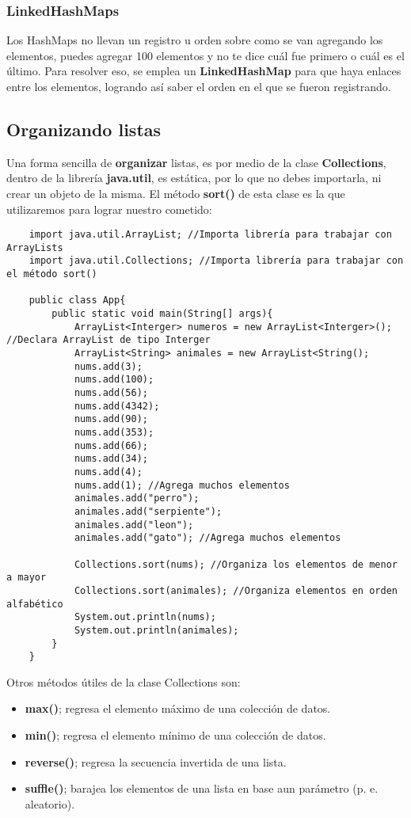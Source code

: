 \subsubsection{LinkedHashMaps}
Los HashMaps no llevan un registro u orden sobre como se van agregando los elementos, puedes agregar 100 elementos y no te dice cuál fue primero o cuál es el último. Para resolver eso, se emplea un \textbf{LinkedHashMap} para que haya enlaces entre los elementos, logrando así saber el orden en el que se fueron registrando.

\subsection{Organizando listas}
Una forma sencilla de \textbf{organizar} listas, es por medio de la clase \textbf{Collections}, dentro de la librería \textbf{java.util}, es estática, por lo que no debes importarla, ni crear un objeto de la misma. El método \textbf{sort()} de esta clase es la que utilizaremos para lograr nuestro cometido:
\begin{lstlisting}
    import java.util.ArrayList; //Importa librería para trabajar con ArrayLists
    import java.util.Collections; //Importa librería para trabajar con el método sort()
    
    public class App{
        public static void main(String[] args){
            ArrayList<Interger> numeros = new ArrayList<Interger>(); //Declara ArrayList de tipo Interger
            ArrayList<String> animales = new ArrayList<String();
            nums.add(3);
            nums.add(100);
            nums.add(56);
            nums.add(4342);
            nums.add(90);
            nums.add(353);
            nums.add(66);
            nums.add(34);
            nums.add(4);
            nums.add(1); //Agrega muchos elementos
            animales.add("perro");
            animales.add("serpiente");
            animales.add("leon");
            animales.add("gato"); //Agrega muchos elementos
            
            Collections.sort(nums); //Organiza los elementos de menor a mayor
            Collections.sort(animales); //Organiza elementos en orden alfabético
            System.out.println(nums);
            System.out.println(animales);
        }
    }
\end{lstlisting}
Otros métodos útiles de la clase Collections son:
\begin{itemize}
    \item \textbf{max()}; regresa el elemento máximo de una colección de datos.
    \item \textbf{min()}; regresa el elemento mínimo de una colección de datos.
    \item \textbf{reverse()}; regresa la secuencia invertida de una lista.
    \item \textbf{suffle()}; barajea los elementos de una lista en base aun parámetro (p. e. aleatorio).
\end{itemize}

